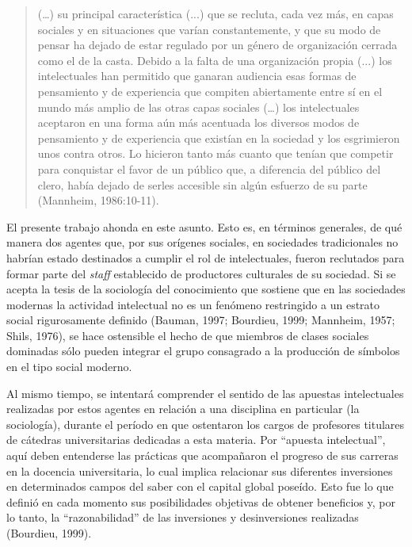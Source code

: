 \begin{quote}
(\ldots) su principal característica (...) que se recluta, cada vez más, en capas sociales y en situaciones que varían constantemente, y que su modo de pensar ha dejado de estar regulado por un género de organización cerrada como el de la casta. Debido a la falta de una organización propia (...) los intelectuales han permitido que ganaran audiencia esas formas de pensamiento y de experiencia que compiten abiertamente entre sí en el mundo más amplio de las otras capas sociales (\ldots) los intelectuales aceptaron en una forma aún más acentuada los diversos modos de pensamiento y de experiencia que existían en la sociedad y los esgrimieron unos contra otros. Lo hicieron tanto más cuanto que tenían que competir para conquistar el favor de un público que, a diferencia del público del clero, había dejado de serles accesible sin algún esfuerzo de su parte (Mannheim, 1986:10-11).
\end{quote}

El presente trabajo ahonda en este asunto. Esto es, en términos generales, de qué manera dos agentes que, por sus orígenes sociales, en sociedades tradicionales no habrían estado destinados a cumplir el rol de intelectuales, fueron reclutados para formar parte del \emph{staff} establecido de productores culturales de su sociedad. Si se acepta la tesis de la sociología del conocimiento que sostiene que en las sociedades modernas la actividad intelectual no es un fenómeno restringido a un estrato social rigurosamente definido (Bauman, 1997; Bourdieu, 1999; Mannheim, 1957; Shils, 1976), se hace ostensible el hecho de que miembros de clases sociales dominadas sólo pueden integrar el grupo consagrado a la producción de símbolos en el tipo social moderno.

Al mismo tiempo, se intentará comprender el sentido de las apuestas intelectuales realizadas por estos agentes en relación a una disciplina en particular (la sociología), durante el período en que ostentaron los cargos de profesores titulares de cátedras universitarias dedicadas a esta materia. Por ``apuesta intelectual'', aquí deben entenderse las prácticas que acompañaron el progreso de sus carreras en la docencia universitaria, lo cual implica relacionar sus diferentes inversiones en determinados campos del saber con el capital global poseído. Esto fue lo que definió en cada momento sus posibilidades objetivas de obtener beneficios y, por lo tanto, la ``razonabilidad'' de las inversiones y desinversiones realizadas (Bourdieu, 1999).

